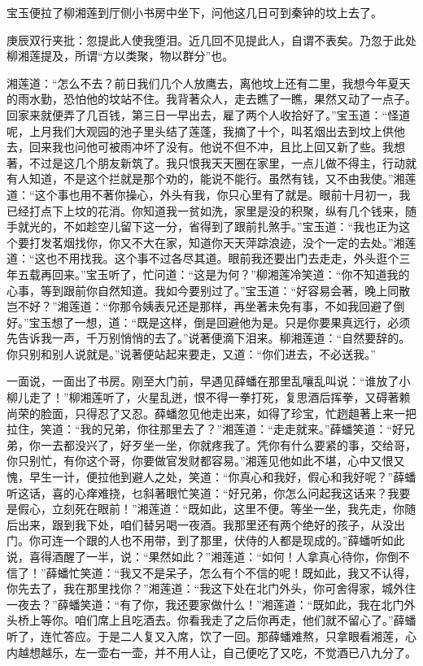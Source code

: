 \begin{parag}
    宝玉便拉了柳湘莲到厅侧小书房中坐下，问他这几日可到秦钟的坟上去了。\begin{note}庚辰双行夹批：忽提此人使我堕泪。近几回不见提此人，自谓不表矣。乃忽于此处柳湘莲提及，所谓“方以类聚，物以群分”也。\end{note}湘莲道：“怎么不去？前日我们几个人放鹰去，离他坟上还有二里，我想今年夏天的雨水勤，恐怕他的坟站不住。我背著众人，走去瞧了一瞧，果然又动了一点子。回家来就便弄了几百钱，第三日一早出去，雇了两个人收拾好了。”宝玉道：“怪道呢，上月我们大观园的池子里头结了莲蓬，我摘了十个，叫茗烟出去到坟上供他去，回来我也问他可被雨冲坏了没有。他说不但不冲，且比上回又新了些。我想著，不过是这几个朋友新筑了。我只恨我天天圈在家里，一点儿做不得主，行动就有人知道，不是这个拦就是那个劝的，能说不能行。虽然有钱，又不由我使。”湘莲道：“这个事也用不著你操心，外头有我，你只心里有了就是。眼前十月初一，我已经打点下上坟的花消。你知道我一贫如洗，家里是没的积聚，纵有几个钱来，随手就光的，不如趁空儿留下这一分，省得到了跟前扎煞手。”宝玉道：“我也正为这个要打发茗烟找你，你又不大在家，知道你天天萍踪浪迹，没个一定的去处。”湘莲道：“这也不用找我。这个事不过各尽其道。眼前我还要出门去走走，外头逛个三年五载再回来。”宝玉听了，忙问道：“这是为何？”柳湘莲冷笑道：“你不知道我的心事，等到跟前你自然知道。我如今要别过了。”宝玉道：“好容易会著，晚上同散岂不好？”湘莲道：“你那令姨表兄还是那样，再坐著未免有事，不如我回避了倒好。”宝玉想了一想，道：“既是这样，倒是回避他为是。只是你要果真远行，必须先告诉我一声，千万别悄悄的去了。”说著便滴下泪来。柳湘莲道：“自然要辞的。你只别和别人说就是。”说著便站起来要走，又道：“你们进去，不必送我。”
\end{parag}


\begin{parag}
    一面说，一面出了书房。刚至大门前，早遇见薛蟠在那里乱嚷乱叫说：“谁放了小柳儿走了！”柳湘莲听了，火星乱迸，恨不得一拳打死，复思酒后挥拳，又碍著赖尚荣的脸面，只得忍了又忍。薛蟠忽见他走出来，如得了珍宝，忙趔趄著上来一把拉住，笑道：“我的兄弟，你往那里去了？”湘莲道：“走走就来。”薛蟠笑道：“好兄弟，你一去都没兴了，好歹坐一坐，你就疼我了。凭你有什么要紧的事，交给哥，你只别忙，有你这个哥，你要做官发财都容易。”湘莲见他如此不堪，心中又恨又愧，早生一计，便拉他到避人之处，笑道：“你真心和我好，假心和我好呢？”薛蟠听这话，喜的心痒难挠，乜斜著眼忙笑道：“好兄弟，你怎么问起我这话来？我要是假心，立刻死在眼前！”湘莲道：“既如此，这里不便。等坐一坐，我先走，你随后出来，跟到我下处，咱们替另喝一夜酒。我那里还有两个绝好的孩子，从没出门。你可连一个跟的人也不用带，到了那里，伏侍的人都是现成的。”薛蟠听如此说，喜得酒醒了一半，说：“果然如此？”湘莲道：“如何！人拿真心待你，你倒不信了！”薛蟠忙笑道：“我又不是呆子，怎么有个不信的呢！既如此，我又不认得，你先去了，我在那里找你？”湘莲道：“我这下处在北门外头，你可舍得家，城外住一夜去？”薛蟠笑道：“有了你，我还要家做什么！”湘莲道：“既如此，我在北门外头桥上等你。咱们席上且吃酒去。你看我走了之后你再走，他们就不留心了。”薛蟠听了，连忙答应。于是二人复又入席，饮了一回。那薛蟠难熬，只拿眼看湘莲，心内越想越乐，左一壶右一壶，并不用人让，自己便吃了又吃，不觉酒已八九分了。
\end{parag}



